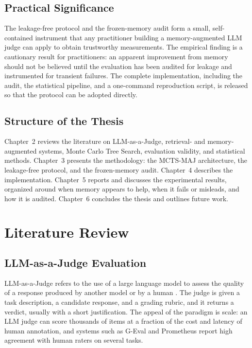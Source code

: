 \documentclass[14pt,a4paper]{extreport}
\begin{document}
\section{Practical Significance}

The leakage-free protocol and the frozen-memory audit form a small, self-contained instrument that any practitioner building a memory-augmented LLM judge can apply to obtain trustworthy measurements. The empirical finding is a cautionary result for practitioners: an apparent improvement from memory should not be believed until the evaluation has been audited for leakage and instrumented for transient failures. The complete implementation, including the audit, the statistical pipeline, and a one-command reproduction script, is released so that the protocol can be adopted directly.

\section{Structure of the Thesis}

Chapter~2 reviews the literature on LLM-as-a-Judge, retrieval- and memory-augmented systems, Monte Carlo Tree Search, evaluation validity, and statistical methods. Chapter~3 presents the methodology: the MCTS-MAJ architecture, the leakage-free protocol, and the frozen-memory audit. Chapter~4 describes the implementation. Chapter~5 reports and discusses the experimental results, organized around when memory appears to help, when it fails or misleads, and how it is audited. Chapter~6 concludes the thesis and outlines future work.

\chapter{Literature Review}

\section{LLM-as-a-Judge Evaluation}

LLM-as-a-Judge refers to the use of a large language model to assess the quality of a response produced by another model or by a human \cite{mt_bench2023, geval2023}. The judge is given a task description, a candidate response, and a grading rubric, and it returns a verdict, usually with a short justification. The appeal of the paradigm is scale: an LLM judge can score thousands of items at a fraction of the cost and latency of human annotation, and systems such as G-Eval \cite{geval2023} and Prometheus \cite{prometheus2023} report high agreement with human raters on several tasks.
\end{document}
